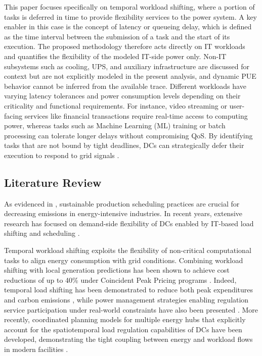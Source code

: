 \documentclass[preprint,12pt]{elsarticle}
\begin{document}
This paper focuses specifically on temporal workload shifting, where a portion of tasks is deferred in time to provide flexibility services to the power system. A key enabler in this case is the concept of latency or queueing delay, which is defined as the time interval between the submission of a task and the start of its execution. %
The proposed methodology therefore acts directly on IT workloads and quantifies the flexibility of the modeled IT-side power only. Non-IT subsystems such as cooling, UPS, and auxiliary infrastructure are discussed for context but are not explicitly modeled in the present analysis, and dynamic PUE behavior cannot be inferred from the available trace. Different workloads have varying latency tolerances and power consumption levels depending on their criticality and functional requirements. For instance, video streaming or user-facing services like financial transactions require real-time access to computing power, whereas tasks such as Machine Learning (ML) training or batch processing can tolerate longer delays without compromising QoS. By identifying tasks that are not bound by tight deadlines, DCs can strategically defer their execution to respond to grid signals \cite{Liu2013, Dabbagh2019}.






\subsection{Literature Review}\label{sec:literature_review}

As evidenced in \cite{Fisco-Compte2025}, sustainable production scheduling practices are crucial for decreasing emissions in energy-intensive industries. In recent years, extensive research has focused on demand-side flexibility of DCs enabled by IT-based load shifting and scheduling \cite{CHEN2020109466,CAO2022119665}.

Temporal workload shifting exploits the flexibility of non-critical computational tasks to align energy consumption with grid conditions. Combining workload shifting with local generation predictions has been shown to achieve cost reductions of up to 40\% under Coincident Peak Pricing programs \cite{Liu2013}. Indeed, temporal load shifting has been demonstrated to reduce both peak expenditures and carbon emissions \cite{Zhang2023_TSC}, while power management strategies enabling regulation service participation under real-world constraints have also been presented \cite{Zhang2021_DATE}. More recently, coordinated planning models for multiple energy hubs that explicitly account for the spatiotemporal load regulation capabilities of DCs have been developed, demonstrating the tight coupling between energy and workload flows in modern facilities \cite{Zhang2024_TPWRS}.
\end{document}
